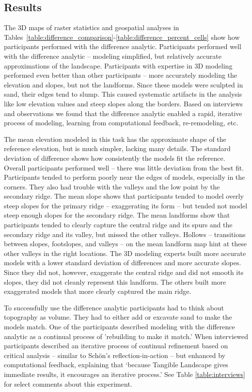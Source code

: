 \documentclass[Afour,sagev,times]{sagej} %
\begin{document}
\subsection{Results}
The 3D maps of raster statistics and geospatial analyses in
Tables~\ref{table:difference_comparison}-\ref{table:difference_percent_cells} 
show how participants performed with the difference analytic.
Participants performed well with the difference analytic 
-- modeling simplified, 
but relatively accurate approximations of the landscape.
Participants with expertise in 3D modeling 
performed even better than other participants 
-- more accurately modeling the elevation and slopes,
but not the landforms. 
Since these models were sculpted in sand,
their edges tend to slump.
This caused systematic artifacts in the analysis like
low elevation values and steep slopes
along the borders. 
Based on interviews and observations
we found that the difference analytic enabled
a rapid, iterative process 
of modeling, learning from computational feedback, 
re-remodeling, etc.

The mean elevation modeled in this task
has the approximate shape of the reference elevation, 
but is much simpler, lacking many details. 
The standard deviation of difference shows 
how consistently the models fit the reference. 
Overall participants performed well -- 
there was little deviation from the best fit. 
Participants tended to perform poorly 
near the edges of models, especially in the corners.
They also had trouble with the valleys 
and the low point by the secondary ridge.
The mean slope shows that participants tended to model 
overly steep slopes for the primary ridge -- exaggerating its form --
but tended not model steep enough slopes for the secondary ridge. 
The mean landforms show that participants tended to 
clearly capture the central ridge and its spurs and
the secondary ridge and its valley, but missed the 
other valleys.
Hollows -- transitions between slopes, footslopes, and valleys -- 
on the mean landform map hint at these other 
valleys in the right locations.
The 3D modeling experts built more accurate models
with a lower standard deviation of differences 
and more accurate slopes. 
Since they did not, however, exaggerate the central ridge
and did not smooth its slopes, 
they did not cleanly represent this landform. 
The others built more exaggerated models 
that more clearly captured the main ridge.

To successfully use the difference analytic 
participants had to think about topography as volume.
They had to either add or excavate sand to make the models match. 
One of the participants 
described modeling with the difference analytic
as a continual process of 'rebuilding to make it match.'
When interviewed
participants described an iterative process of 
continual refinement based on critical analysis 
-- similar to Sch{\"o}n's reflection-in-action \cite{Schon1983} --
but enhanced by computational feedback,
explaining that 
`because Tangible Landscape gives immediate results, 
it encourages an iterative process.' 
See Table \ref{table:interviews} for select comments about this experiment.
\end{document}
